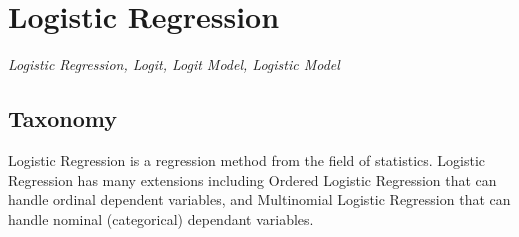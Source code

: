 
\section{Logistic Regression} 
\label{sec:logistic}

\emph{Logistic Regression, Logit, Logit Model, Logistic Model}

\subsection{Taxonomy}
Logistic Regression is a regression method from the field of statistics.
Logistic Regression has many extensions including Ordered Logistic Regression that can handle ordinal dependent variables, and Multinomial Logistic Regression that can handle nominal (categorical) dependant variables.


